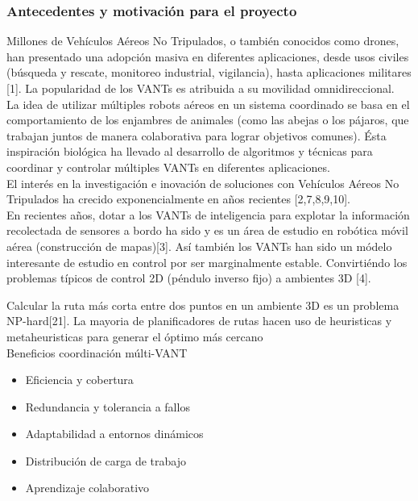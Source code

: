 \documentclass[
	11pt, %
]{beamer}
\begin{document}
\begin{frame}

  \frametitle{Antecedentes y motivación para el proyecto}
  {\footnotesize
  Millones de Vehículos Aéreos No Tripulados, o también conocidos como drones, han presentado una adopción masiva en diferentes aplicaciones, desde usos civiles (búsqueda y rescate, monitoreo industrial, vigilancia), hasta aplicaciones militares [1]. La popularidad de los VANTs es atribuida a su movilidad omnidireccional.\\

  La idea de utilizar múltiples robots aéreos en un sistema coordinado se basa en el comportamiento de los enjambres de animales (como las abejas o los pájaros, que trabajan juntos de manera colaborativa para lograr objetivos comunes). Ésta inspiración biológica ha llevado al desarrollo de algoritmos y técnicas para coordinar y controlar múltiples VANTs en diferentes aplicaciones.\\

  El interés en la investigación e inovación de soluciones con Vehículos Aéreos No Tripulados ha crecido exponencialmente en años recientes [2,7,8,9,10].\\
  }
  \bigskip %
  {\footnotesize
  En recientes años, dotar a los VANTs de inteligencia para explotar la información recolectada de sensores a bordo ha sido y es un área de estudio en robótica móvil aérea (construcción de mapas)[3]. Así también los VANTs han sido un módelo interesante de estudio en control por ser marginalmente estable. Convirtiéndo los problemas típicos de control 2D (péndulo inverso fijo) a ambientes 3D [4].
  }
  
\end{frame}

\begin{frame}
  Calcular la ruta más corta entre dos puntos en un ambiente 3D es un problema NP-hard[21]. La mayoria de planificadores de rutas hacen uso de heuristicas y metaheuristicas para generar el óptimo más cercano \\
  \bigskip %
  Beneficios coordinación múlti-VANT
  \begin{itemize}
  \item Eficiencia y cobertura
  \item Redundancia y tolerancia a fallos
  \item Adaptabilidad a entornos dinámicos
  \item Distribución de carga de trabajo
  \item Aprendizaje colaborativo
  \end{itemize}
\end{frame}
\end{document}
